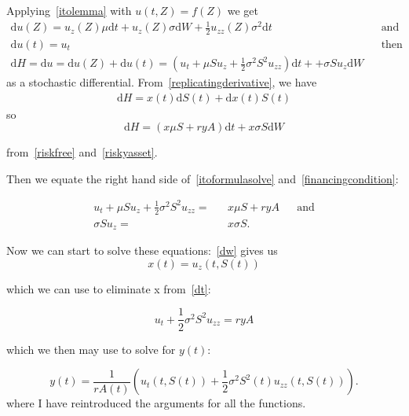 \documentclass[11pt]{article} %
\begin{document}
Applying~\eqref{itolemma} with $u(t,Z) = f(Z)$ we get   
\begin{align}\label{itoformulasolve}
    \mathrm{d}u(Z)  = u_z(Z)\mu \mathrm{d}t + u_z(Z)\sigma \mathrm{d}W + \frac{1}{2}
    u_{zz}(Z) \sigma^2 \mathrm{d}t&& \text{and} \\
    \mathrm{d}u(t) = u_t &&\text{then} \\
    \mathrm{d}H =\mathrm{d}u = \mathrm{d}u(Z) +\mathrm{d}u(t) =   (u_t + \mu S u_z + \frac{1}{2} 
    \sigma^2 S^2 u_{zz})\mathrm{d}t + +\sigma S u_z \mathrm{d}W
\end{align}
as a stochastic differential.
From~\eqref{replicatingderivative}, we have
\begin{align}
    \mathrm{d}H = x(t)\mathrm{d}S(t) +\mathrm{d}x(t)S(t) 
\end{align}
so
\begin{equation}\label{financingcondition}
    \mathrm{d}H = (x\mu S + ryA)\mathrm{d}t + x \sigma S \mathrm{d}W 
\end{equation}

from~\eqref{riskfree} and~\eqref{riskyasset}.

Then we equate the right hand side of~\eqref{itoformulasolve} and~\eqref{financingcondition}:

\begin{align}\label{dt}
    u_t + \mu S u_z + \frac{1}{2} \sigma^2 S^2 u_{zz}  = &&x\mu S + ryA &&\text{and} \\
    \sigma Su_z =&& x\sigma S.\label{dw}
\end{align}

Now we can start to solve these equations:~\eqref{dw} gives us
\begin{equation}
    x(t) = u_z(t,S(t))
\end{equation}

which we can use to eliminate x from~\eqref{dt}:

\begin{equation}
    u_t + \frac{1}{2}\sigma ^2 S^2u_{zz} = ryA
\end{equation}

which we then may use to solve for $y(t)$:

\begin{equation}
    y(t) = \frac{1}{rA(t)}(u_t(t,S(t)) + \frac{1}{2} \sigma^2S^2(t)u_{zz}(t,S(t)) ).
\end{equation}
where I have reintroduced the arguments for all the functions.
\end{document}
